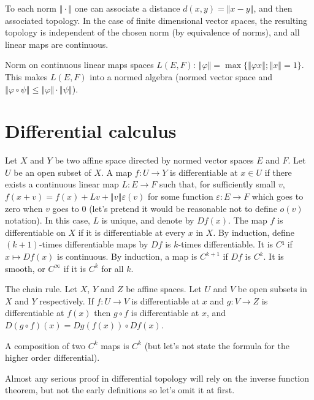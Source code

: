 \documentclass{article}
\begin{document}
To each norm $‖·‖$ one can associate a distance $d(x, y) = ‖x - y‖$, and
then associated topology. In the case of finite dimensional vector
spaces, the resulting topology is independent of the chosen norm (by
equivalence of norms), and all linear maps are continuous.

Norm on continuous linear maps spaces $L(E, F)$: 
$‖φ‖ = \max \{‖φx‖ ; ‖x‖ = 1\}$. This makes $L(E, F)$ into a normed
algebra (normed vector space and $‖φ ∘ ψ‖ ≤ ‖φ‖·‖ψ‖$). 

\section{Differential calculus}
\label{sec:differential_calculus}

Let $X$ and $Y$ be two affine space directed by normed vector spaces
$E$ and $F$. Let $U$ be an open subset of $X$. A map $f : U → Y$ is
differentiable at $x ∈ U$ if there exists a continuous linear map 
$L : E → F$ such that, for sufficiently small $v$,
$f(x + v) = f(x) + Lv + ‖v‖ε(v)$ for some function $ε : E → F$ which
goes to zero when $v$ goes to $0$ (let's pretend it would be reasonable
not to define $o(v)$ notation). In this case, $L$ is unique, and denote
by $Df(x)$. The map $f$ is differentiable on $X$ if it is differentiable
at every $x$ in $X$. By induction, define $(k+1)$-times differentiable
maps by $Df$ is $k$-times differentiable.
It is $C¹$ if $x ↦ Df(x)$ is continuous. By induction, a map is
$C^{k+1}$ if $Df$ is $C^k$. It is smooth, or $C^∞$ if it is $C^k$ for
all $k$. 

The chain rule. Let $X$, $Y$ and $Z$ be affine spaces. Let $U$ and $V$
be open subsets in $X$ and $Y$ respectively. If $f : U → V$ is
differentiable at $x$ and $g : V → Z$ is differentiable at $f(x)$ then
$g ∘ f$ is differentiable at $x$, and $D(g ∘ f)(x) = Dg(f(x)) ∘ Df(x)$.

A composition of two $C^k$ maps is $C^k$ (but let's not state the
formula for the higher order differential).

Almost any serious proof in differential topology will rely on the
inverse function theorem, but not the early definitions so let's omit it
at first.
\end{document}
